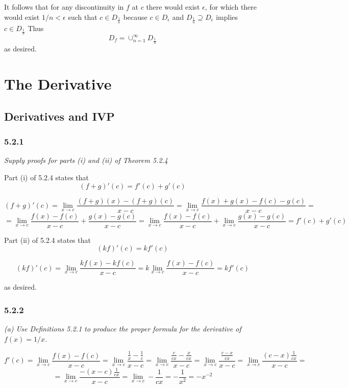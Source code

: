 \documentclass[11pt,oneside,titlepage]{book}
\begin{document}
It follows that for any discontinuity in $f$  at $c$
there would exist $\epsilon$, for which there would exist $1/n < \epsilon$
such that $c \in D_{\frac 1 n}$ because
$c \in D_{\epsilon}$ and $D_{\frac 1 n} \supseteq D_\epsilon$ implies
$c \in  D_{\frac 1 n}$ Thus
$$D_f = \cup_{n = 1}^{\infty}D_{\frac 1 n }$$
as desired.

\chapter{The Derivative}

\section{Derivatives and IVP}

\subsection*{5.2.1}
\textit{Supply proofs for parts (i) and (ii) of Theorem 5.2.4}

Part (i)  of 5.2.4 states that
$$(f + g)'(c) = f'(c) + g'(c)$$

$$(f + g)'(c) = \lim_{x \to c}\frac{(f + g)(x) - (f + g)(c)}{x - c} 
= \lim_{x \to c}\frac{f(x) + g(x) - f(c) - g(c)}{x - c} = $$
$$=  \lim_{x \to c}\frac{f(x) - f(c)}{x - c} + \frac{g(x) - g(c)}{x - c} =
\lim_{x \to c}\frac{f(x) - f(c)}{x - c} +
\lim_{x \to c}\frac{g(x) - g(c)}{x - c} = f'(c) + g'(c)
$$

Part (ii) of 5.2.4 states that
$$(kf)'(c) = kf'(c)$$

$$(kf)'(c) = \lim_{x \to c}\frac{kf(x) - kf(c)}{x - c} =
k \lim_{x \to c}\frac{f(x) - f(c)}{x - c} = k f'(c)$$

as desired.

\subsection*{5.2.2}
\textit{(a) Use Definitions 5.2.1 to produce the proper formula for the
  derivative of $f(x) = 1/x$.}

$$f'(c) = \lim_{x \to c}\frac{f(x) - f(c)}{x - c} =
\lim_{x \to c}\frac{\frac 1 x  - \frac 1 c}{x - c} =
\lim_{x \to c}\frac{\frac{c}{cx}  - \frac{x}{cx}}{x - c} =
\lim_{x \to c}\frac{\frac{c - x}{cx}}{x - c} =
\lim_{x \to c}\frac{(c - x)\frac{1}{cx}}{x - c} =$$
$$ = \lim_{x \to c}\frac{- (x - c)\frac{1}{cx}}{x - c} =
\lim_{x \to c} - \frac{1}{cx} =  - \frac{1}{x^2} = - x^{-2}$$
\end{document}
